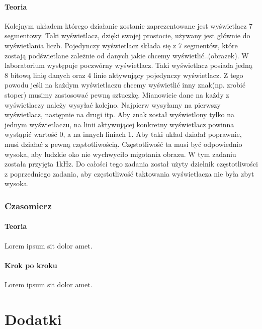 \documentclass[12pt]{article}
\begin{document}
\subsection{Teoria}
Kolejnym układem którego działanie zostanie zaprezentowane jest wyświetlacz 7 segmentowy. Taki wyświetlacz, dzięki swojej prostocie, używany jest głównie do wyświetlania liczb. Pojedynczy wyświetlacz składa się z 7 segmentów, które zostają podświetlane zależnie od danych jakie chcemy wyświetlić..(obrazek). W laboratorium występuje  poczwórny wyświetlacz. Taki wyświetlacz posiada jedną 8 bitową linię danych oraz 4 linie aktywujący pojedynczy wyświetlacz. Z tego powodu jeśli na każdym wyświetlaczu chcemy wyświetlić inny znak(np. zrobić stoper) musimy zastosować pewną sztuczkę. Mianowicie dane na każdy z wyświetlaczy należy wysyłać kolejno. Najpierw wysyłamy na pierwszy wyświetlacz, następnie na drugi itp. Aby znak został wyświetlony tylko na jednym wyświetlaczu, na linii aktywującej konkretny wyświetlacz powinna wystąpić wartość 0, a na innych liniach 1. Aby taki układ działał poprawnie, musi działać z pewną częstotliwością. Częstotliwość ta musi być odpowiednio wysoka, aby ludzkie oko nie wychwyciło migotania obrazu. W tym zadaniu została przyjęta 1kHz. Do całości tego zadania został użyty dzielnik częstotliwości z poprzedniego zadania, aby częstotliwość taktowania wyświetlacza nie była zbyt wysoka. 
\newpage
\section{Czasomierz}
\subsection{Teoria}
Lorem ipsum sit dolor amet.
\subsection{Krok po kroku}
Lorem ipsum sit dolor amet.

\newpage
\part{Dodatki}
\end{document}
